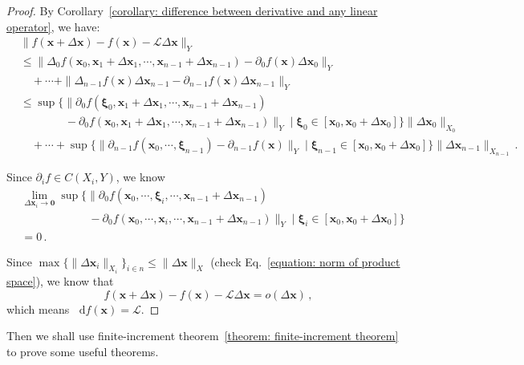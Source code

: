 \documentclass[openany]{book}
\theoremstyle{plain}
\theoremstyle{definition}
\newcommand{\dif}{\mathop{}\!\mathrm{d}} %
\newcommand*{\bv}{\boldsymbol} %
\begin{document}
\begin{proof}
	By Corollary~\ref{corollary: difference between derivative and any linear operator}, we have:
	\begin{align*}
		&\|f(\bv x + \Delta \bv x) - f(\bv x) - \mathscr L \Delta \bv x\|_Y 
		\\
		&\leq \|\Delta_0 f(\bv x_0, \bv x_1 + \Delta \bv x_1, \cdots, \bv x_{n-1} + \Delta \bv x_{n-1}) - \partial_0 f(\bv x)\Delta \bv x_0\|_Y
		\\
		&\quad + \cdots 
		 + \|\Delta_{n-1} f(\bv x) \Delta \bv x_{n-1} - \partial_{n-1} f(\bv x) \Delta \bv x_{n-1}\|_Y
		\\
		&\leq \sup\Big\{\big\|\partial_0 f(\bv \xi_0, \bv x_1 + \Delta \bv x_1, \cdots, \bv x_{n-1} + \Delta \bv x_{n-1}) 
		\\
			&\qquad\qquad - \partial_0 f(\bv x_0, \bv x_1 + \Delta \bv x_1, \cdots, \bv x_{n-1} + \Delta \bv x_{n-1})\big\|_Y
		\mid \bv \xi_0 \in [\bv x_0, \bv x_0 + \Delta \bv x_0]\Big\} 
			\|\Delta \bv x_0\|_{X_0}
		\\
		&\quad + \cdots 
		 + \sup\Big\{\big\|\partial_{n-1} f(\bv x_0, \cdots, \bv \xi_{n-1}) - \partial_{n-1} f(\bv x)\big\|_Y
		 \mid \bv \xi_{n-1} \in [\bv x_0, \bv x_0 + \Delta \bv x_0]\Big\} 
			 \|\Delta \bv x_{n-1}\|_{X_{n-1}} \,.
	\end{align*}

	Since $\partial_i f \in C(X_i, Y)$, we know
	\begin{align*}
		&\lim_{\Delta \bv x_i \to \bv 0}\sup\Big\{\big\|\partial_0 f(\bv x_0, \cdots, \bv \xi_i, \cdots, \bv x_{n-1} + \Delta \bv x_{n-1}) 
		\\
			&\qquad\qquad\qquad - \partial_0 f(\bv x_0, \cdots, \bv x_i, \cdots, \bv x_{n-1} + \Delta \bv x_{n-1})\big\|_Y
		\mid \bv \xi_i \in [\bv x_0, \bv x_0 + \Delta \bv x_0]\Big\} 
		\\
		&= 0\,.
	\end{align*}

	Since $\max\{\|\Delta \bv x_i\|_{X_{i}}\}_{i \in n} \leq \|\Delta \bv x\|_X$ (check Eq.~\eqref{equation: norm of product space}), we know that
	\begin{equation*}
		f(\bv x + \Delta \bv x) - f(\bv x) - \mathscr L \Delta \bv x
		= o(\Delta \bv x)\,,
	\end{equation*}
	which means $\dif f(\bv x) = \mathscr L$.
\end{proof}

Then we shall use finite-increment theorem~\ref{theorem: finite-increment theorem} to prove some useful theorems.
\end{document}
